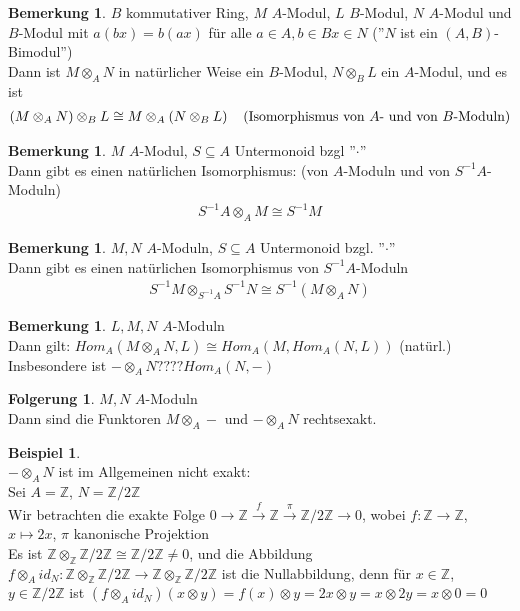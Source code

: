 \documentclass[10pt,a4paper,numbers=endperiod]{scrreprt}
\theoremstyle{definition}
\newtheorem{bem}[satz]{Bemerkung}
\newtheorem{bsp}[satz]{Beispiel}
\newtheorem{folg}[satz]{Folgerung}
\def\ZZ{{\mathbb Z}}
\begin{document}
\begin{bem}
	$B$ kommutativer Ring, $M$ $A$-Modul, $L$ $B$-Modul, $N$ $A$-Modul und $B$-Modul mit $a(bx) = b(ax)$ für alle $a \in A, b \in B x \in N$ (''$N$ ist ein $(A, B)$-Bimodul'')\\
	Dann ist $M \otimes_A N$ in natürlicher Weise ein $B$-Modul, $N \otimes_B L$ ein $A$-Modul, und es ist \begin{align*}
		(M \otimes_A N) \otimes_B L \cong M \otimes_A (N \otimes_B L) \hspace*{4mm} (\text{Isomorphismus von $A$- und von $B$-Moduln})
	\end{align*}
\end{bem}

\begin{bem}
	$M$ $A$-Modul, $S \subseteq A$ Untermonoid bzgl ''$\cdot$''\\
	Dann gibt es einen natürlichen Isomorphismus: (von $A$-Moduln und von $S^{-1}A$-Moduln) \begin{align*}
		S^{-1}A \otimes_A M \cong S^{-1} M
	\end{align*}
\end{bem}

\begin{bem}
	$M, N$ $A$-Moduln, $S \subseteq A$ Untermonoid bzgl. ''$\cdot$''\\
	Dann gibt es einen natürlichen Isomorphismus von $S^{-1}A$-Moduln \begin{align*}
		S^{-1}M \otimes_{S^{-1}A} S^{-1}N \cong S^{-1}(M \otimes_A N)
	\end{align*}
\end{bem}

\begin{bem}
	$L, M, N$ $A$-Moduln\\
	Dann gilt: $Hom_A(M \otimes_A N, L) \cong Hom_A(M, Hom_A(N, L))$ \hspace*{3mm} (natürl.)\\
	Insbesondere ist $- \otimes_A N ???? Hom_A(N, -)$
\end{bem}

\begin{folg}
	$M, N$ $A$-Moduln\\
	Dann sind die Funktoren $M \otimes_A-$ und $-\otimes_A N$ rechtsexakt.\\
\end{folg}

\begin{bsp}
	$ $\\
	$-\otimes_A N$ ist im Allgemeinen nicht exakt:\\
	Sei $A = \ZZ$, $N = \ZZ/2\ZZ$\\
	Wir betrachten die exakte Folge $0 \to \ZZ \overset{f}{\to} \ZZ \overset{\pi}{\to} \ZZ/2\ZZ \to 0$, wobei $f: \ZZ \to \ZZ$, $x \mapsto 2x$, $\pi$ kanonische Projektion\\
	Es ist $\ZZ \otimes_\ZZ \ZZ/2\ZZ \cong \ZZ/2\ZZ \neq 0$, und die Abbildung $f \otimes_A id_N: \ZZ \otimes_\ZZ \ZZ/2\ZZ \to \ZZ \otimes_\ZZ \ZZ/2\ZZ$ ist die Nullabbildung, denn für $x \in \ZZ$, $y \in \ZZ/2\ZZ$ ist $(f \otimes_A id_N)(x \otimes y) = f(x) \otimes y = 2x \otimes y = x \otimes 2y = x \otimes 0 = 0$
\end{bsp}
\end{document}
